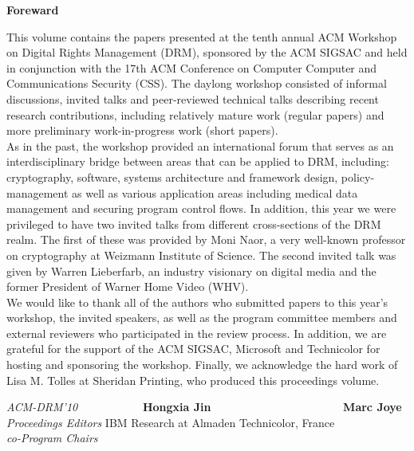 \documentclass[11pt]{article}
\begin{document}
\begin{center}
{\bf\Large Foreward}
\end{center}

\noindent

This volume contains the papers presented at the tenth annual ACM
Workshop on Digital Rights Management (DRM), sponsored by the ACM
SIGSAC and held in conjunction with the 17th ACM Conference on
Computer Computer and Communications Security (CSS).  The daylong
workshop consisted of  informal discussions, invited talks and
peer-reviewed technical talks describing recent research
contributions, including relatively mature work (regular papers) and
more preliminary
work-in-progress work (short papers). ~\\

As in the past, the workshop provided an international forum that
serves as an interdisciplinary bridge between areas that can be
applied to DRM, including: cryptography, software, systems
architecture and framework design, policy-management as well as
various application areas including medical data management and
securing program control flows. In addition, this year we were
privileged to have two invited talks from different cross-sections
of the DRM realm. The first of these was provided by Moni Naor, a
very well-known professor on cryptography at Weizmann Institute of
Science. The second invited talk was given by Warren Lieberfarb, an
industry visionary on digital media and
the former President of Warner Home Video (WHV).~\\

We would like to thank all of the authors who submitted papers to
this year's workshop, the invited speakers, as well as the program
committee members and external reviewers who participated in the
review process.   In addition, we are grateful for the support of
the ACM SIGSAC, Microsoft and Technicolor for hosting and sponsoring
the workshop.  Finally, we acknowledge the hard work of Lisa M.
Tolles at Sheridan Printing, who produced this proceedings volume.
~\\

\begin{tabbing}
{\it ACM-DRM'10}  \ \ \ \ \ \ \ \ \ \ \ \= {\bf Hongxia Jin} \ \ \ \ \ \ \ \ \ \ \ \ \ \ \ \ \ \ \ \ \ \ \ \= {\bf Marc Joye} \\
{\it Proceedings Editors} \> IBM Research at Almaden \>  Technicolor, France\\
{\it co-Program Chairs}
\end{tabbing}
\end{document}
